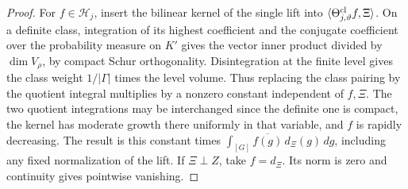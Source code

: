 \documentclass[a4paper,11pt]{article}
\theoremstyle{definition}
\theoremstyle{remark}
\numberwithin{equation}{section}
\begin{document}
\begin{proof}
For \(f\in\mathcal H_j\), insert the bilinear kernel of the
single lift into \(\langle\Theta^{\rm cl}_{j,\vartheta} f,\Xi\rangle\).
On a definite class, integration of its highest coefficient and
the conjugate coefficient over the probability measure on \(K'\)
gives the vector inner product divided by \(\dim V_\rho\), by
compact Schur orthogonality. Disintegration at the finite level
gives the class weight \(1/|\Gamma|\) times the level volume.
Thus replacing the class pairing by the quotient integral
multiplies by a nonzero constant independent of \(f,\Xi\).
The two quotient integrations may be interchanged since the
definite one is compact, the kernel has moderate growth there
uniformly in that variable, and \(f\) is rapidly decreasing.
The result is this constant times
\(\int_{[G]}\overline{f(g)}\,d_\Xi(g)\,dg\), including any
fixed normalization of the lift. If \(\Xi\perp Z\), take
\(f=d_\Xi\). Its norm is zero and continuity gives pointwise
vanishing.
\end{proof}
\end{document}
